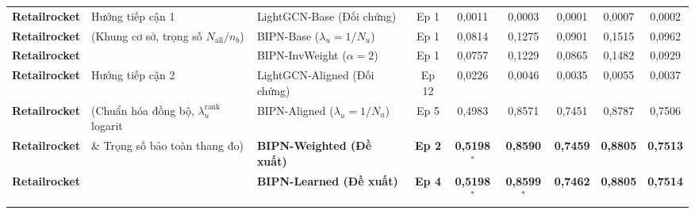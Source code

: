 \documentclass{llncs}
\begin{document}
\begin{table}[H]
{\begin{tabular}{lllcccccc}
\midrule
\textbf{Retailrocket} & Hướng tiếp cận 1 & LightGCN-Base (Đối chứng) & Ep 1 & 0{,}0011 & 0{,}0003 & 0{,}0001 & 0{,}0007 & 0{,}0002 \\
\textbf{Retailrocket} & (Khung cơ sở, trọng số $N_{\mathrm{all}}/n_b$) & BIPN-Base ($\lambda_u = 1/N_u$) & Ep 1 & 0{,}0814 & 0{,}1275 & 0{,}0901 & 0{,}1515 & 0{,}0962 \\
\textbf{Retailrocket} & & BIPN-InvWeight ($\alpha=2$) & Ep 1 & 0{,}0757 & 0{,}1229 & 0{,}0865 & 0{,}1482 & 0{,}0929 \\
\cmidrule(lr){2-9}
\textbf{Retailrocket} & Hướng tiếp cận 2 & LightGCN-Aligned (Đối chứng) & Ep 12 & 0{,}0226 & 0{,}0046 & 0{,}0035 & 0{,}0055 & 0{,}0037 \\
\textbf{Retailrocket} & (Chuẩn hóa đồng bộ, $\lambda_u^{\mathrm{rank}}$ logarit & BIPN-Aligned ($\lambda_u = 1/N_u$) & Ep 5 & 0{,}4983 & 0{,}8571 & 0{,}7451 & 0{,}8787 & 0{,}7506 \\
\textbf{Retailrocket} & \& Trọng số bảo toàn thang đo) & \textbf{BIPN-Weighted (Đề xuất)} & \textbf{Ep 2} & \textbf{0{,}5198}$^{*}$ & \textbf{0{,}8590} & \textbf{0{,}7459} & \textbf{0{,}8805} & \textbf{0{,}7513} \\
\textbf{Retailrocket} & & \textbf{BIPN-Learned (Đề xuất)} & \textbf{Ep 4} & \textbf{0{,}5198}$^{*}$ & \textbf{0{,}8599}$^{*}$ & \textbf{0{,}7462} & \textbf{0{,}8805} & \textbf{0{,}7514} \\
\bottomrule
\end{tabular}%
}
\end{table}
\end{document}
